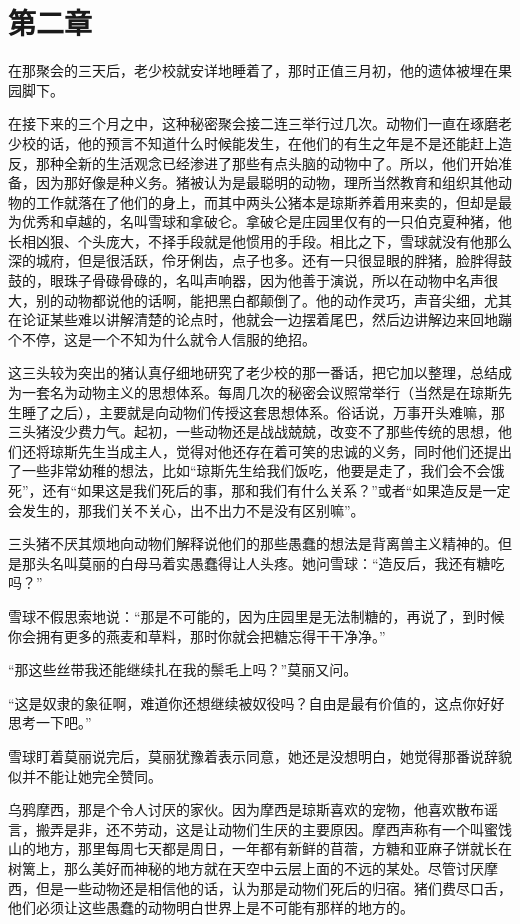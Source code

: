 \chapter{第二章}

在那聚会的三天后，老少校就安详地睡着了，那时正值三月初，他的遗体被埋在果园脚下。

在接下来的三个月之中，这种秘密聚会接二连三举行过几次。动物们一直在琢磨老少校的话，他的预言不知道什么时候能发生，在他们的有生之年是不是还能赶上造反，那种全新的生活观念已经渗进了那些有点头脑的动物中了。所以，他们开始准备，因为那好像是种义务。猪被认为是最聪明的动物，理所当然教育和组织其他动物的工作就落在了他们的身上，而其中两头公猪本是琼斯养着用来卖的，但却是最为优秀和卓越的，名叫雪球和拿破仑。拿破仑是庄园里仅有的一只伯克夏种猪，他长相凶狠、个头庞大，不择手段就是他惯用的手段。相比之下，雪球就没有他那么深的城府，但是很活跃，伶牙俐齿，点子也多。还有一只很显眼的胖猪，脸胖得鼓鼓的，眼珠子骨碌骨碌的，名叫声响器，因为他善于演说，所以在动物中名声很大，别的动物都说他的话啊，能把黑白都颠倒了。他的动作灵巧，声音尖细，尤其在论证某些难以讲解清楚的论点时，他就会一边摆着尾巴，然后边讲解边来回地蹦个不停，这是一个不知为什么就令人信服的绝招。

这三头较为突出的猪认真仔细地研究了老少校的那一番话，把它加以整理，总结成为一套名为动物主义的思想体系。每周几次的秘密会议照常举行（当然是在琼斯先生睡了之后），主要就是向动物们传授这套思想体系。俗话说，万事开头难嘛，那三头猪没少费力气。起初，一些动物还是战战兢兢，改变不了那些传统的思想，他们还将琼斯先生当成主人，觉得对他还存在着可笑的忠诚的义务，同时他们还提出了一些非常幼稚的想法，比如“琼斯先生给我们饭吃，他要是走了，我们会不会饿死”，还有“如果这是我们死后的事，那和我们有什么关系？”或者“如果造反是一定会发生的，那我们关不关心，出不出力不是没有区别嘛”。

三头猪不厌其烦地向动物们解释说他们的那些愚蠢的想法是背离兽主义精神的。但是那头名叫莫丽的白母马着实愚蠢得让人头疼。她问雪球：“造反后，我还有糖吃吗？”

雪球不假思索地说：“那是不可能的，因为庄园里是无法制糖的，再说了，到时候你会拥有更多的燕麦和草料，那时你就会把糖忘得干干净净。”

“那这些丝带我还能继续扎在我的鬃毛上吗？”莫丽又问。

“这是奴隶的象征啊，难道你还想继续被奴役吗？自由是最有价值的，这点你好好思考一下吧。”

雪球盯着莫丽说完后，莫丽犹豫着表示同意，她还是没想明白，她觉得那番说辞貌似并不能让她完全赞同。

乌鸦摩西，那是个令人讨厌的家伙。因为摩西是琼斯喜欢的宠物，他喜欢散布谣言，搬弄是非，还不劳动，这是让动物们生厌的主要原因。摩西声称有一个叫蜜饯山的地方，那里每周七天都是周日，一年都有新鲜的苜蓿，方糖和亚麻子饼就长在树篱上，那么美好而神秘的地方就在天空中云层上面的不远的某处。尽管讨厌摩西，但是一些动物还是相信他的话，认为那是动物们死后的归宿。猪们费尽口舌，他们必须让这些愚蠢的动物明白世界上是不可能有那样的地方的。


